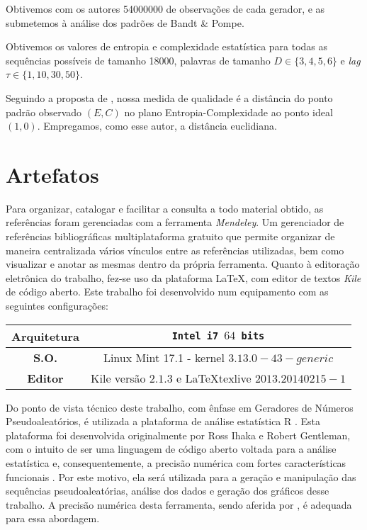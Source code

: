 Obtivemos com os autores \num{54000000} de observações de cada gerador, e as submetemos à análise dos padrões de Bandt \& Pompe.

Obtivemos os valores de entropia e complexidade estatística para todas as sequências possíveis de tamanho \num{18000}, palavras de tamanho $D\in\{3, 4, 5, 6\}$ e \textit{lag} $\tau\in\{1, 10, 30,50\}$.

Seguindo a proposta de \citet{NewPermutationEntropy}, nossa medida de qualidade é a distância do ponto padrão observado $(E,C)$ no plano Entropia-Complexidade ao ponto ideal $(1,0)$.
Empregamos, como esse autor, a distância euclidiana.


\section{Artefatos}Para organizar, catalogar e facilitar a consulta a todo material obtido, as referências foram gerenciadas com a ferramenta \emph{Mendeley}. Um gerenciador de referências bibliográficas multiplataforma gratuito que permite organizar de maneira centralizada vários vínculos entre as referências utilizadas, bem como visualizar e anotar as mesmas dentro da própria ferramenta. Quanto à editoração eletrônica do trabalho, fez-se uso da plataforma \LaTeX, com editor de textos \emph{Kile} de código aberto. Este trabalho foi desenvolvido num equipamento com as seguintes configurações:

\begin{center}
\begin{tabular}{c||c}
\hline
\textbf{Arquitetura} & \texttt{Intel i7 $64$ bits}\\
\hline
\textbf{S.O.} & Linux Mint 17.1 - kernel $3.13.0-43-generic$\\
\hline
\textbf{Editor} & Kile versão $2.1.3$ e \LaTeX texlive $2013.20140215-1$\\
\hline
\end{tabular}
\end{center}

  Do ponto de vista técnico deste trabalho, com ênfase em Geradores de Números Pseudoaleatórios, é utilizada a plataforma de análise estatística R . Esta plataforma foi desenvolvida originalmente por Ross Ihaka e Robert Gentleman, com o intuito de ser uma linguagem de código aberto voltada para a análise estatística e, consequentemente, a precisão numérica com fortes características funcionais \citep{Rmanual}. Por este motivo, ela será utilizada para a geração e manipulação das sequências pseudoaleatórias, análise dos dados e geração dos gráficos desse trabalho. A precisão numérica desta ferramenta, sendo aferida por \citet{Almiron:09}, é adequada para essa abordagem.

